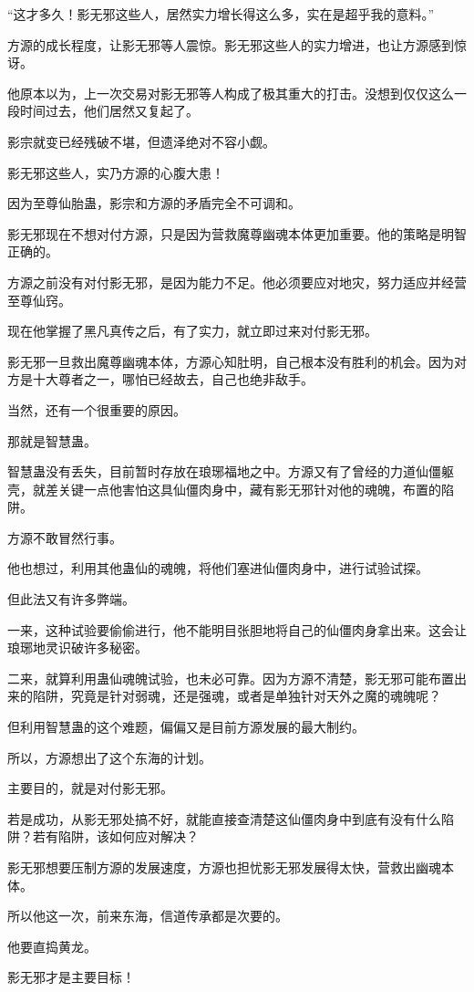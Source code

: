 \begin{this_body}
“这才多久！影无邪这些人，居然实力增长得这么多，实在是超乎我的意料。”

方源的成长程度，让影无邪等人震惊。影无邪这些人的实力增进，也让方源感到惊讶。

他原本以为，上一次交易对影无邪等人构成了极其重大的打击。没想到仅仅这么一段时间过去，他们居然又复起了。

影宗就变已经残破不堪，但遗泽绝对不容小觑。

影无邪这些人，实乃方源的心腹大患！

因为至尊仙胎蛊，影宗和方源的矛盾完全不可调和。

影无邪现在不想对付方源，只是因为营救魔尊幽魂本体更加重要。他的策略是明智正确的。

方源之前没有对付影无邪，是因为能力不足。他必须要应对地灾，努力适应并经营至尊仙窍。

现在他掌握了黑凡真传之后，有了实力，就立即过来对付影无邪。

影无邪一旦救出魔尊幽魂本体，方源心知肚明，自己根本没有胜利的机会。因为对方是十大尊者之一，哪怕已经故去，自己也绝非敌手。

当然，还有一个很重要的原因。

那就是智慧蛊。

智慧蛊没有丢失，目前暂时存放在琅琊福地之中。方源又有了曾经的力道仙僵躯壳，就差关键一点他害怕这具仙僵肉身中，藏有影无邪针对他的魂魄，布置的陷阱。

方源不敢冒然行事。

他也想过，利用其他蛊仙的魂魄，将他们塞进仙僵肉身中，进行试验试探。

但此法又有许多弊端。

一来，这种试验要偷偷进行，他不能明目张胆地将自己的仙僵肉身拿出来。这会让琅琊地灵识破许多秘密。

二来，就算利用蛊仙魂魄试验，也未必可靠。因为方源不清楚，影无邪可能布置出来的陷阱，究竟是针对弱魂，还是强魂，或者是单独针对天外之魔的魂魄呢？

但利用智慧蛊的这个难题，偏偏又是目前方源发展的最大制约。

所以，方源想出了这个东海的计划。

主要目的，就是对付影无邪。

若是成功，从影无邪处搞不好，就能直接查清楚这仙僵肉身中到底有没有什么陷阱？若有陷阱，该如何应对解决？

影无邪想要压制方源的发展速度，方源也担忧影无邪发展得太快，营救出幽魂本体。

所以他这一次，前来东海，信道传承都是次要的。

他要直捣黄龙。

影无邪才是主要目标！

\end{this_body}


